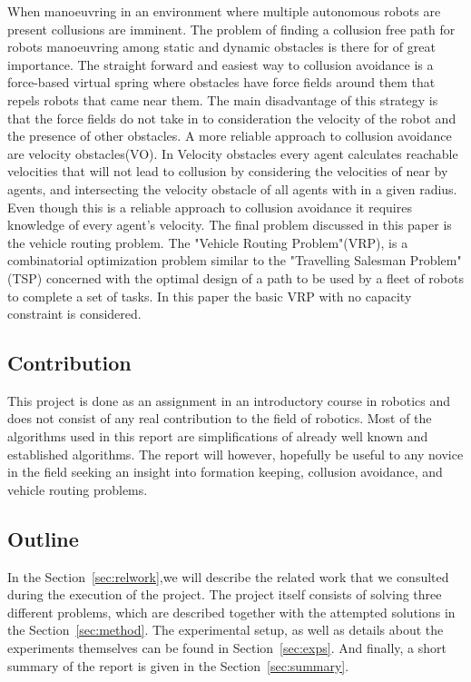 \documentclass[a4paper,12pt]{article}
\begin{document}
When manoeuvring in an environment where multiple autonomous robots are present collusions are imminent. The problem of finding a collusion free path for robots manoeuvring among static and dynamic obstacles is there for of great importance. The straight forward and easiest way to collusion avoidance is a force-based virtual spring where obstacles have force fields around them that repels robots that came near them. The main disadvantage of this strategy is that the force fields do not take in to consideration the velocity of the robot and the presence of other obstacles. A more reliable approach to collusion avoidance are velocity obstacles(VO)\cite{wilkie2009generalized}\cite{van2008reciprocal}. In Velocity obstacles every agent calculates reachable velocities that will not lead to collusion by considering the velocities of near by agents, and intersecting the velocity obstacle of all agents with in a given radius. Even though this is a reliable approach to collusion avoidance it requires knowledge of every agent's velocity. The final problem discussed in this paper is the vehicle routing problem. The "Vehicle Routing Problem"(VRP), is a combinatorial optimization problem similar to the "Travelling Salesman Problem"(TSP) concerned with the optimal design of a path to be used by a fleet of robots to complete a set of tasks. In this paper the basic VRP with no capacity constraint is considered.      
 

\subsection{Contribution} 
 This project is done as an assignment in an introductory course in robotics and does not consist of any real contribution to the field of robotics. Most of the algorithms used in this report are simplifications of already well known and established algorithms. 
The report will however, hopefully be useful to any novice in the field seeking an insight into formation keeping, collusion avoidance, and vehicle routing problems.

\subsection{Outline}
In the Section~\ref{sec:relwork},we will describe the related work that we consulted during the execution of the project. The project itself consists of solving three different problems, which are described together with the attempted solutions in the Section~\ref{sec:method}. The experimental setup, as well as details about the experiments themselves can be found in Section~\ref{sec:exps}. And finally, a short summary of the report is given in the Section~\ref{sec:summary}.
 
\end{document}
